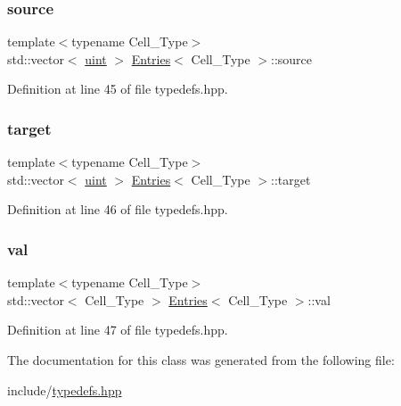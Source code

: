 \subsubsection{\texorpdfstring{source}{source}}
{\footnotesize\ttfamily template$<$typename Cell\+\_\+\+Type$>$ \\
std\+::vector$<$ \hyperlink{typedefs_8hpp_a91ad9478d81a7aaf2593e8d9c3d06a14}{uint} $>$ \hyperlink{class_entries}{Entries}$<$ Cell\+\_\+\+Type $>$\+::source}



Definition at line 45 of file typedefs.\+hpp.

\mbox{\label{class_entries_a02dad3917fa68044b9ea9c60b2909fd7}} 
\subsubsection{\texorpdfstring{target}{target}}
{\footnotesize\ttfamily template$<$typename Cell\+\_\+\+Type$>$ \\
std\+::vector$<$ \hyperlink{typedefs_8hpp_a91ad9478d81a7aaf2593e8d9c3d06a14}{uint} $>$ \hyperlink{class_entries}{Entries}$<$ Cell\+\_\+\+Type $>$\+::target}



Definition at line 46 of file typedefs.\+hpp.

\mbox{\label{class_entries_ae0726e20b17868665cdae6ff70f93bb4}} 
\subsubsection{\texorpdfstring{val}{val}}
{\footnotesize\ttfamily template$<$typename Cell\+\_\+\+Type$>$ \\
std\+::vector$<$ Cell\+\_\+\+Type $>$ \hyperlink{class_entries}{Entries}$<$ Cell\+\_\+\+Type $>$\+::val}



Definition at line 47 of file typedefs.\+hpp.



The documentation for this class was generated from the following file\+:\begin{DoxyCompactItemize}
\item 
include/\hyperlink{typedefs_8hpp}{typedefs.\+hpp}\end{DoxyCompactItemize}
